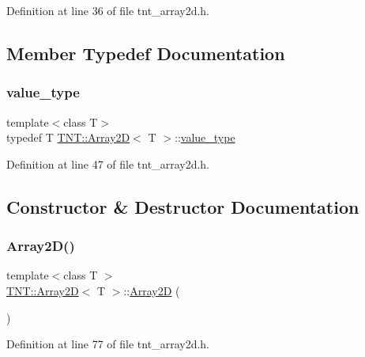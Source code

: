 Definition at line 36 of file tnt\+\_\+array2d.\+h.



\subsection{Member Typedef Documentation}
\mbox{\label{classTNT_1_1Array2D_a4b8dd8e113fb40e26d44bc2f7a45cb44}} 
\subsubsection{\texorpdfstring{value\+\_\+type}{value\_type}}
{\footnotesize\ttfamily template$<$class T$>$ \\
typedef T \hyperlink{classTNT_1_1Array2D}{T\+N\+T\+::\+Array2D}$<$ T $>$\+::\hyperlink{classTNT_1_1Array2D_a4b8dd8e113fb40e26d44bc2f7a45cb44}{value\+\_\+type}}



Definition at line 47 of file tnt\+\_\+array2d.\+h.



\subsection{Constructor \& Destructor Documentation}
\mbox{\label{classTNT_1_1Array2D_ab01d5e4b88c04d9e4906e7ea069f9dc0}} 
\subsubsection{\texorpdfstring{Array2\+D()}{Array2D()}\hspace{0.1cm}{\footnotesize\ttfamily [1/5]}}
{\footnotesize\ttfamily template$<$class T $>$ \\
\hyperlink{classTNT_1_1Array2D}{T\+N\+T\+::\+Array2D}$<$ T $>$\+::\hyperlink{classTNT_1_1Array2D}{Array2D} (\begin{DoxyParamCaption}{ }\end{DoxyParamCaption})}



Definition at line 77 of file tnt\+\_\+array2d.\+h.


